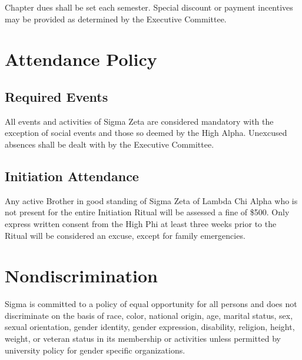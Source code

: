 \documentclass{article}
\begin{document}
Chapter dues shall be set each semester. Special discount or payment incentives
may be provided as determined by the Executive Committee.

\section{Attendance Policy}\label{Attendance Policy}

\subsection{Required Events}

All events and activities of Sigma Zeta are considered mandatory with the
exception of social events and those so deemed by the High Alpha. Unexcused
absences shall be dealt with by the Executive Committee.

\subsection{Initiation Attendance}

Any active Brother in good standing of Sigma Zeta of Lambda Chi Alpha who is not
present for the entire Initiation Ritual will be assessed a fine of \$500. Only
express written consent from the High Phi at least three weeks prior to the
Ritual will be considered an excuse, except for family emergencies.

\section{Nondiscrimination}

Sigma 
is committed to a policy of equal opportunity for all persons and does not
discriminate on the basis of race, color, national origin, age, marital status,
sex, sexual orientation, gender identity, gender expression, disability,
religion, height, weight, or veteran status in its membership or activities
unless permitted by university policy for gender specific organizations.
\end{document}

